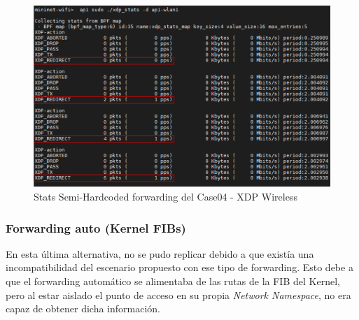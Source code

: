 \newpage

\begin{figure}[ht!]
    \centering
    \includegraphics[width=15.5cm]{archivos/img/dev/xdp-wifi/case04/demo_case04_semihard_2_edited.png}
    \caption{Stats Semi-Hardcoded forwarding del Case04 - XDP Wireless}
    \label{fig:case04_xdp_wifi_func4}
\end{figure}

\subsubsection{Forwarding auto (Kernel FIBs)}
\label{xdp_wifi_case04_auto}

En esta última alternativa, no se pudo replicar  debido a que existía una incompatibilidad del escenario propuesto con ese tipo de forwarding. Esto debe a que el forwarding automático se alimentaba de las rutas de la FIB del Kernel, pero al estar aislado el punto de acceso en su propia \textit{Network Namespace}, no era capaz de obtener dicha información.